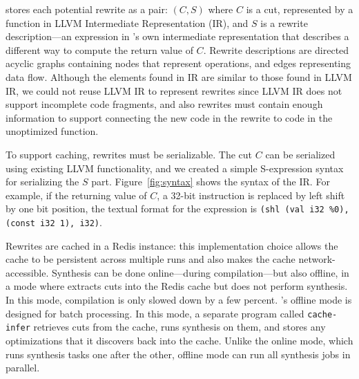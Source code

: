 \minotaur{} stores each potential rewrite as a pair: $(C, S)$
where $C$ is a cut, represented by a function in LLVM
Intermediate Representation (IR), and $S$ is a rewrite description---an
expression in \minotaur's own intermediate representation that describes a
different way to compute the return value of $C$.
%
Rewrite descriptions are directed acyclic graphs containing nodes that represent
operations, and edges representing data flow.
%
Although the elements found in \minotaur{} IR are similar to those found
in LLVM IR, we could not reuse LLVM IR to represent rewrites since
LLVM IR does not support incomplete code fragments, and also rewrites
must contain enough information to support connecting the new code in
the rewrite to code in the unoptimized function.


To support caching, rewrites must be serializable.
%
The cut $C$ can be serialized using existing LLVM functionality, and we
created a simple S-expression syntax for serializing the $S$ part.
%
Figure~\ref{fig:syntax} shows the syntax of the IR\@.
%
For example, if the returning value of $C$, a 32-bit instruction is
replaced by left shift by one bit position, the textual format for
the expression is \texttt{(shl (val i32 \%0), (const i32 1), i32)}.


Rewrites are cached in a Redis instance: this implementation choice
allows the cache to be persistent across multiple \minotaur{} runs and
also makes the cache network-accessible.
%
Synthesis can be done online---during compilation---but also
offline, in a mode where \minotaur{} extracts cuts into the Redis
cache but does not perform synthesis.
%
In this mode, compilation is only slowed down by a few percent.
%
\minotaur's offline mode is designed for batch processing.
%
In this mode, a separate program called \texttt{cache-infer} retrieves
cuts from the cache, runs synthesis on them, and stores any
optimizations that it discovers back into the cache.
%
Unlike the online mode, which runs synthesis tasks one after the
other, offline mode can run all synthesis jobs in parallel.



